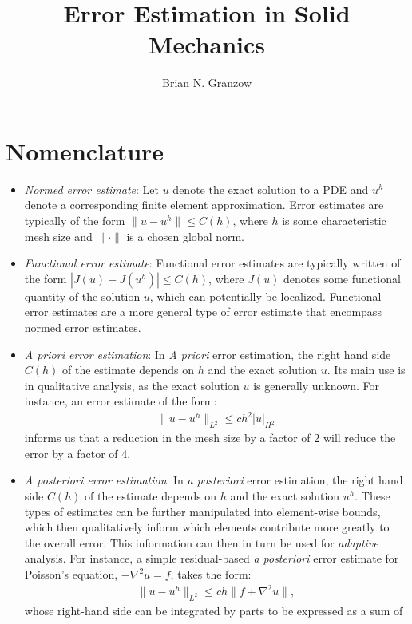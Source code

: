 \documentclass{article}
\title{Error Estimation in Solid Mechanics}
\author{Brian N. Granzow}
\begin{document}
\maketitle

\section{Nomenclature}

\begin{itemize}
\item \emph{Normed error estimate}: Let $u$ denote the exact solution to a
PDE and $u^h$ denote a corresponding finite element approximation.
Error estimates are typically of the form $\| u - u^h \| \leq C(h)$,
where $h$ is some characteristic mesh size and $\| \cdot \|$ is a
chosen global norm.
\item \emph{Functional error estimate}: Functional error estimates
are typically written of the form $| J(u) - J(u^h) | \leq C(h)$,
where $J(u)$ denotes some functional quantity of the solution $u$, which
can potentially be localized. Functional error estimates are a more
general type of error estimate that encompass normed error estimates.
\item \emph{A priori error estimation}: In \emph{A priori} error estimation,
the right hand side $C(h)$ of the estimate depends on $h$ and the
exact solution $u$. Its main use is in qualitative analysis, as the exact
solution $u$ is generally unknown. For instance, an error estimate of the
form:
\begin{gather}
\| u - u^h \| _{L^2} \leq ch^2 | u |_{H^2}
\end{gather}
informs us that a reduction in the mesh size by a factor of 2 will reduce
the error by a factor of 4.
\item \emph{A posteriori error estimation}: In \emph{a posteriori} error
estimation, the right hand side $C(h)$ of the estimate depends on $h$
and the exact solution $u^h$. These types of estimates can be further
manipulated into element-wise bounds, which then qualitatively inform
which elements contribute more greatly to the overall error. This information
can then in turn be used for \emph{adaptive} analysis. For instance,
a simple residual-based \emph{a posteriori} error estimate for Poisson's
equation, $- \nabla^2 u = f$, takes the form:
\begin{gather}
\| u - u^h \| _{L^2} \leq c h \| f + \nabla^2u \|,
\end{gather}
whose right-hand side can be integrated by parts to be expressed as a sum of

\end{itemize}
\end{document}
